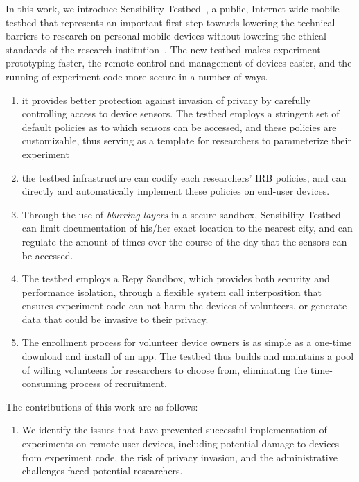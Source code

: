 \begin{itemize}
In this work, we introduce Sensibility Testbed~\cite{sensibility,
zhuang2015privacy}, a public,
Internet-wide mobile testbed that represents an important first step
towards lowering the technical barriers to research on personal mobile
devices without lowering the
ethical standards of the research
institution~\cite{zevenbergen2013ethical}.
The new testbed makes experiment prototyping faster, the remote
control and management of devices easier, and the running of
experiment code more secure in a number of ways.

\begin{enumerate}
\item  it provides better protection against invasion of privacy by carefully controlling
access to device sensors. The testbed employs a stringent set of
default policies as to which sensors can be accessed, and these
policies are customizable, thus serving as a template for researchers
to parameterize their experiment

\item   the testbed infrastructure can codify each researchers' IRB policies, and can
directly and automatically implement these policies on end-user
devices. 

\item  Through the use of \textit{blurring layers} in a secure
sandbox, Sensibility Testbed can limit documentation of his/her exact
location to the nearest city, and can regulate the amount of times
over the course of the day that the sensors can be accessed.

\item The testbed employs a Repy Sandbox, which provides both security and performance isolation,
through a flexible system call interposition that ensures experiment code can not harm the
devices of volunteers, or generate data that could be invasive to
their privacy.

\item  The enrollment process for volunteer device owners is as
simple as a one-time download and install of an app. The testbed thus
builds and maintains a pool of willing volunteers for researchers to
choose from, eliminating the time-consuming process of recruitment.
\end{enumerate}

The contributions of this work are as follows:

\begin{enumerate}
\item We identify the issues that have prevented successful implementation
of experiments on remote user devices, including potential damage to
devices from experiment code, the risk of privacy invasion, and the
administrative challenges faced potential researchers.


\end{enumerate}
\end{itemize}
